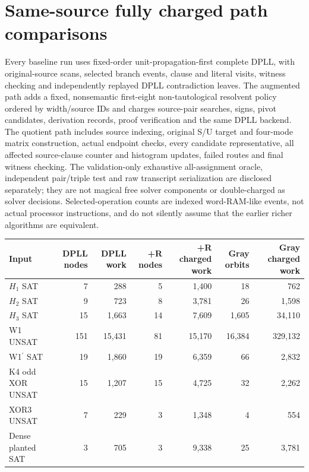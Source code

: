 \documentclass[10pt]{article}
\begin{document}
\section{Same-source fully charged path comparisons}
Every baseline run uses fixed-order unit-propagation-first complete DPLL, with original-source scans, selected branch events, clause and literal visits, witness checking and independently replayed DPLL contradiction leaves. The augmented path adds a fixed, nonsemantic first-eight non-tautological resolvent policy ordered by width/source IDs and charges source-pair searches, signs, pivot candidates, derivation records, proof verification and the same DPLL backend. The quotient path includes source indexing, original S/U target and four-mode matrix construction, actual endpoint checks, every candidate representative, all affected source-clause counter and histogram updates, failed routes and final witness checking. The validation-only exhaustive all-assignment oracle, independent pair/triple test and raw transcript serialization are disclosed separately; they are not magical free solver components or double-charged as solver decisions. Selected-operation counts are indexed word-RAM-like events, not actual processor instructions, and do not silently assume that the earlier richer algorithms are equivalent.
\begin{center}\scriptsize
\begin{tabular}{@{}lrrrrrr@{}}\toprule
Input&DPLL nodes&DPLL work&+R nodes&+R charged work&Gray orbits&Gray charged work\\\midrule
$H_1$ SAT & 7 & 288 & 5 & 1,400 & 18 & 762 \\
$H_2$ SAT & 9 & 723 & 8 & 3,781 & 26 & 1,598 \\
$H_3$ SAT & 15 & 1,663 & 14 & 7,609 & 1,605 & 34,110 \\
W1 UNSAT & 151 & 15,431 & 81 & 15,170 & 16,384 & 329,132 \\
W1$^\prime$ SAT & 19 & 1,860 & 19 & 6,359 & 66 & 2,832 \\
K4 odd XOR UNSAT & 15 & 1,207 & 15 & 4,725 & 32 & 2,262 \\
XOR3 UNSAT & 7 & 229 & 3 & 1,348 & 4 & 554 \\
Dense planted SAT & 3 & 705 & 3 & 9,338 & 25 & 3,781 \\
\bottomrule\end{tabular}
\end{center}
\end{document}
